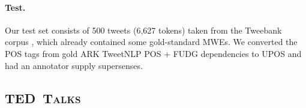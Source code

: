 \documentclass[11pt,letterpaper]{article}
\newcommand{\ensuretext}[1]{#1}
\newcommand{\nssmarker}{\ensuretext{\textcolor{magenta}{\ensuremath{^{\textsc{NS}}_{\textsc{S}}}}}}
\newcommand{\arkcomment}[3]{\ensuretext{\textcolor{#3}{[#1 #2]}}}
\newcommand{\nss}[1]{\arkcomment{\nssmarker}{#1}{magenta}}
\newcommand{\dataset}[1]{\mbox{\textsc{#1}}}	%
\begin{document}

\paragraph{Test.}
Our test set consists of 500 tweets (6,627 tokens) taken from the Tweebank corpus \citep{kong-14}, 
which already contained some gold-standard MWEs. 
We converted the POS tags from gold ARK TweetNLP POS + FUDG dependencies to UPOS 
and had an annotator supply supersenses.


\subsection{\dataset{TED Talks}}
\end{document}
